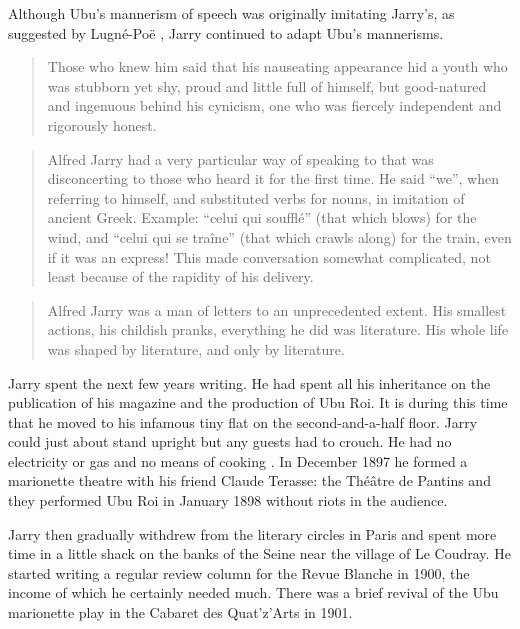 Although Ubu's mannerism of speech was originally imitating Jarry's, as suggested by Lugné-Poë \autocite[p.155]{Brotchie2011}, Jarry continued to adapt Ubu's mannerisms.

\begin{quotation}
  Those who knew him said that his nauseating appearance hid a youth who was stubborn yet shy, proud and little full of himself, but good-natured and ingenuous behind his cynicism, one who was fiercely independent and rigorously honest. 
\end{quotation}

\begin{quotation}
  Alfred Jarry had a very particular way of speaking to that was disconcerting to those who heard it for the first time. He said ``we'', when referring to himself, and substituted verbs for nouns, in imitation of ancient Greek. Example: ``celui qui soufflé'' (that which blows) for the wind, and ``celui qui se traîne'' (that which crawls along) for the train, even if it was an express! This made conversation somewhat complicated, not least because of the rapidity of his delivery. 
\end{quotation}

\begin{quotation}
  Alfred Jarry was a man of letters to an unprecedented extent. His smallest actions, his childish pranks, everything he did was literature. His whole life was shaped by literature, and only by literature. 
\end{quotation}

Jarry spent the next few years writing. He had spent all his inheritance on the publication of his magazine and the production of Ubu Roi. It is during this time that he moved to his infamous tiny flat on the second-and-a-half floor. Jarry could just about stand upright but any guests had to crouch. He had no electricity or gas and no means of cooking \autocite[p.195]{Brotchie2011}. In December 1897 he formed a marionette theatre with his friend Claude Terasse: the Théâtre de Pantins and they performed Ubu Roi in January 1898 without riots in the audience.

Jarry then gradually withdrew from the literary circles in Paris and spent more time in a little shack on the banks of the Seine near the village of Le Coudray. He started writing a regular review column for the Revue Blanche in 1900, the income of which he certainly needed much. There was a brief revival of the Ubu marionette play in the Cabaret des Quat'z'Arts in 1901.

